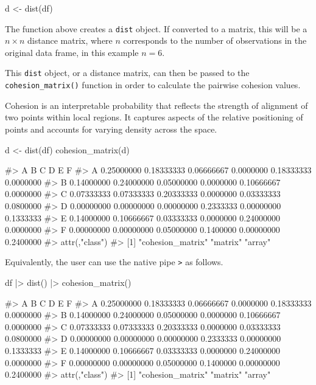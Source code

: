 \begin{Schunk}
\begin{Sinput}
d <- dist(df)
\end{Sinput}
\end{Schunk}

The function above creates a \texttt{dist} object. If converted to a
matrix, this will be a \(n\times n\) distance matrix, where \(n\)
corresponds to the number of observations in the original data frame, in
this example \(n = 6\).

This \texttt{dist} object, or a distance matrix, can then be passed to
the \texttt{cohesion\_matrix()} function in order to calculate the
pairwise cohesion values.

Cohesion is an interpretable probability that reflects the strength of
alignment of two points within local regions. It captures aspects of the
relative positioning of points and accounts for varying density across
the space.

\begin{Schunk}
\begin{Sinput}
d <- dist(df)
cohesion_matrix(d)
\end{Sinput}
\begin{Soutput}
#>            A          B          C         D          E         F
#> A 0.25000000 0.18333333 0.06666667 0.0000000 0.18333333 0.0000000
#> B 0.14000000 0.24000000 0.05000000 0.0000000 0.10666667 0.0000000
#> C 0.07333333 0.07333333 0.20333333 0.0000000 0.03333333 0.0800000
#> D 0.00000000 0.00000000 0.00000000 0.2333333 0.00000000 0.1333333
#> E 0.14000000 0.10666667 0.03333333 0.0000000 0.24000000 0.0000000
#> F 0.00000000 0.00000000 0.05000000 0.1400000 0.00000000 0.2400000
#> attr(,"class")
#> [1] "cohesion_matrix" "matrix"          "array"
\end{Soutput}
\end{Schunk}

Equivalently, the user can use the native pipe
\texttt{\textbar{}\textgreater{}} as follows.

\begin{Schunk}
\begin{Sinput}
df |>
  dist() |>
  cohesion_matrix()
\end{Sinput}
\begin{Soutput}
#>            A          B          C         D          E         F
#> A 0.25000000 0.18333333 0.06666667 0.0000000 0.18333333 0.0000000
#> B 0.14000000 0.24000000 0.05000000 0.0000000 0.10666667 0.0000000
#> C 0.07333333 0.07333333 0.20333333 0.0000000 0.03333333 0.0800000
#> D 0.00000000 0.00000000 0.00000000 0.2333333 0.00000000 0.1333333
#> E 0.14000000 0.10666667 0.03333333 0.0000000 0.24000000 0.0000000
#> F 0.00000000 0.00000000 0.05000000 0.1400000 0.00000000 0.2400000
#> attr(,"class")
#> [1] "cohesion_matrix" "matrix"          "array"
\end{Soutput}
\end{Schunk}

